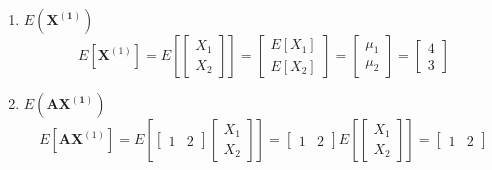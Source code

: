         \begin{enumerate}[label=(\alph*)]
            \item $E\left(\mathbf{X^{(1)}}\right)$
            \[
                E\left[\mathbf{X}^{(1)}\right]
                = 
                E\left[
                    \begin{bmatrix}
                        X_1 \\
                        X_2
                    \end{bmatrix}
                \right]
                =
                \begin{bmatrix}
                    E[X_1] \\
                    E[X_2]
                \end{bmatrix}
                =
                \begin{bmatrix}
                    \mu_1 \\
                    \mu_2
                \end{bmatrix}
                =\begin{bmatrix}
                    4 \\
                    3
                \end{bmatrix}
            \]
            \item $E\left(\mathbf{A}\mathbf{X^{(1)}}\right)$
            \[
                E\left[\mathbf{A}\mathbf{X}^{(1)}\right]
                =
                E\left[
                    \begin{bmatrix}
                        1 & 2
                    \end{bmatrix}
                    \begin{bmatrix}
                        X_1 \\
                        X_2
                    \end{bmatrix}
                \right]
                =
                \begin{bmatrix}
                    1 & 2
                \end{bmatrix}
                E\left[
                    \begin{bmatrix}
                        X_1 \\
                        X_2
                    \end{bmatrix}
                \right]
                =
                \begin{bmatrix}
                    1 & 2
                \end{bmatrix}
\]
\end{enumerate}
